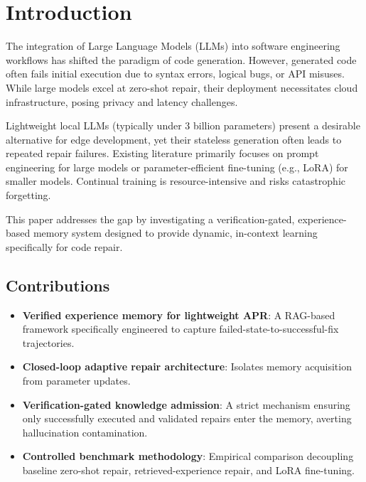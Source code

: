 \section{Introduction}
The integration of Large Language Models (LLMs) into software engineering workflows has shifted the paradigm of code generation. However, generated code often fails initial execution due to syntax errors, logical bugs, or API misuses. While large models excel at zero-shot repair, their deployment necessitates cloud infrastructure, posing privacy and latency challenges.

Lightweight local LLMs (typically under 3 billion parameters) present a desirable alternative for edge development, yet their stateless generation often leads to repeated repair failures. Existing literature primarily focuses on prompt engineering for large models or parameter-efficient fine-tuning (e.g., LoRA) for smaller models. Continual training is resource-intensive and risks catastrophic forgetting.

This paper addresses the gap by investigating a verification-gated, experience-based memory system designed to provide dynamic, in-context learning specifically for code repair.

\subsection{Contributions}
\begin{itemize}
    \item \textbf{Verified experience memory for lightweight APR}: A RAG-based framework specifically engineered to capture failed-state-to-successful-fix trajectories.
    \item \textbf{Closed-loop adaptive repair architecture}: Isolates memory acquisition from parameter updates.
    \item \textbf{Verification-gated knowledge admission}: A strict mechanism ensuring only successfully executed and validated repairs enter the memory, averting hallucination contamination.
    \item \textbf{Controlled benchmark methodology}: Empirical comparison decoupling baseline zero-shot repair, retrieved-experience repair, and LoRA fine-tuning.
\end{itemize}
